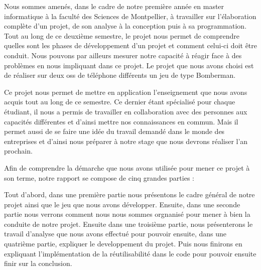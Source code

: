 Nous sommes amenés, dans le cadre de notre première année en master informatique à la faculté des Sciences de Montpellier, à travailler sur l’élaboration complète d’un projet, de son analyse à la conception puis à sa programmation. Tout au long de ce deuxième semestre, le projet nous permet de comprendre quelles sont les phases de développement d’un projet et comment celui-ci doit être conduit. Nous pouvons par ailleurs mesurer notre capacité à réagir face à des problèmes en nous impliquant dans ce projet. Le projet que nous avons choisi est de réaliser sur deux \glspl{os} de téléphone différents un jeu de type Bomberman.

Ce projet nous permet de mettre en application l'enseignement que nous avons acquis tout au long de ce semestre. Ce dernier étant spécialisé pour chaque étudiant, il nous a permis de travailler en collaboration avec des personnes aux capacités différentes et d'ainsi mettre nos connaissances en commun. Mais il permet aussi de se faire une idée du travail demandé dans le monde des entreprises et d'ainsi nous préparer à notre stage que nous devrons réaliser l'an prochain.

Afin de comprendre la démarche que nous avons utilisée pour mener ce projet à son terme, notre rapport se compose de cinq grandes parties : 

Tout d'abord, dans une première partie nous présentons le cadre général de notre projet ainsi que le jeu que nous avons développer. Ensuite, dans une seconde partie nous verrons comment nous nous sommes orgnanisé pour mener à bien la conduite de notre projet. Ensuite dans une troisième partie, nous présenterons le travail d'analyse que nous avons effectué pour pouvoir ensuite, dans une quatrième partie, expliquer le developpement du projet. Puis nous finirons en expliquant l'implémentation de la réutilisabilité dans le code pour pouvoir ensuite finir sur la conclusion.
